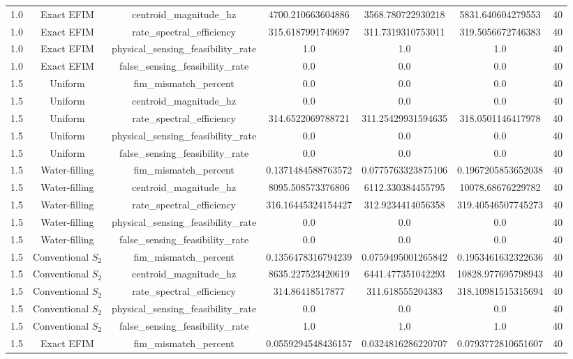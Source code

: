 \begin{table}[t]
\begin{tabular}{lcccccc}
1.0 & Exact EFIM & centroid_magnitude_hz & 4700.210663604886 & 3568.780722930218 & 5831.640604279553 & 40 \\
1.0 & Exact EFIM & rate_spectral_efficiency & 315.6187991749697 & 311.7319310753011 & 319.5056672746383 & 40 \\
1.0 & Exact EFIM & physical_sensing_feasibility_rate & 1.0 & 1.0 & 1.0 & 40 \\
1.0 & Exact EFIM & false_sensing_feasibility_rate & 0.0 & 0.0 & 0.0 & 40 \\
1.5 & Uniform & fim_mismatch_percent & 0.0 & 0.0 & 0.0 & 40 \\
1.5 & Uniform & centroid_magnitude_hz & 0.0 & 0.0 & 0.0 & 40 \\
1.5 & Uniform & rate_spectral_efficiency & 314.6522069788721 & 311.25429931594635 & 318.0501146417978 & 40 \\
1.5 & Uniform & physical_sensing_feasibility_rate & 0.0 & 0.0 & 0.0 & 40 \\
1.5 & Uniform & false_sensing_feasibility_rate & 0.0 & 0.0 & 0.0 & 40 \\
1.5 & Water-filling & fim_mismatch_percent & 0.1371484588763572 & 0.0775763323875106 & 0.1967205853652038 & 40 \\
1.5 & Water-filling & centroid_magnitude_hz & 8095.508573376806 & 6112.330384455795 & 10078.68676229782 & 40 \\
1.5 & Water-filling & rate_spectral_efficiency & 316.16445324154427 & 312.9234414056358 & 319.40546507745273 & 40 \\
1.5 & Water-filling & physical_sensing_feasibility_rate & 0.0 & 0.0 & 0.0 & 40 \\
1.5 & Water-filling & false_sensing_feasibility_rate & 0.0 & 0.0 & 0.0 & 40 \\
1.5 & Conventional $S_2$ & fim_mismatch_percent & 0.1356478316794239 & 0.0759495001265842 & 0.1953461632322636 & 40 \\
1.5 & Conventional $S_2$ & centroid_magnitude_hz & 8635.227523420619 & 6441.477351042293 & 10828.977695798943 & 40 \\
1.5 & Conventional $S_2$ & rate_spectral_efficiency & 314.86418517877 & 311.618555204383 & 318.10981515315694 & 40 \\
1.5 & Conventional $S_2$ & physical_sensing_feasibility_rate & 0.0 & 0.0 & 0.0 & 40 \\
1.5 & Conventional $S_2$ & false_sensing_feasibility_rate & 1.0 & 1.0 & 1.0 & 40 \\
1.5 & Exact EFIM & fim_mismatch_percent & 0.0559294548436157 & 0.0324816286220707 & 0.0793772810651607 & 40 \\

\end{tabular}
\end{table}
